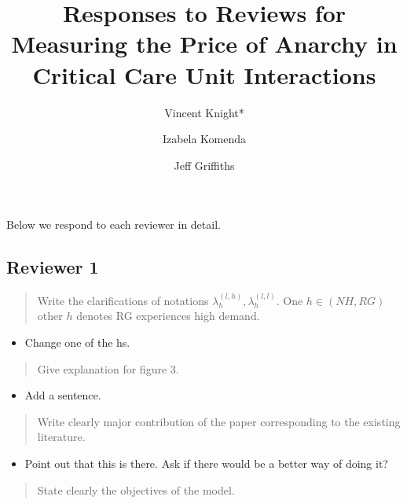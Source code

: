\documentclass{article}
\title{Responses to Reviews for Measuring the Price of Anarchy in Critical Care Unit Interactions}
\author{Vincent Knight*
    \and
        Izabela Komenda
    \and
        Jeff Griffiths}
\begin{document}
\maketitle

Below we respond to each reviewer in detail.

\subsection{Reviewer 1}

\begin{quote}
    \begin{textit}{
Write the clarifications of notations \(\lambda_{h}^{(l,h)},\lambda_{h}^{(l,l)}\). One \(h \in (NH,RG)\) other \(h\) denotes RG experiences high demand.
    }\end{textit}
\end{quote}

\begin{itemize}
    \item Change one of the hs.
\end{itemize}

\begin{quote}
    \begin{textit}{
Give explanation for figure 3.
    }\end{textit}
\end{quote}

\begin{itemize}
    \item Add a sentence.
\end{itemize}

\begin{quote}
    \begin{textit}{
    Write clearly major contribution of the paper corresponding to the existing
    literature.
    }\end{textit}
\end{quote}

\begin{itemize}
    \item Point out that this is there. Ask if there would be a better way of doing it?
\end{itemize}

\begin{quote}
    \begin{textit}{
    State clearly the objectives of the model.
    }\end{textit}
\end{quote}
\end{document}
